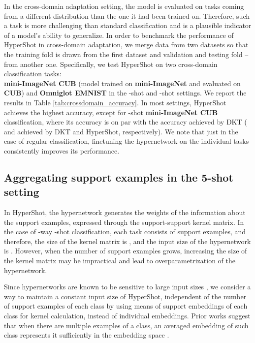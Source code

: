\documentclass[nohyperref]{article}
\def\our{HyperShot}
\theoremstyle{plain}
\theoremstyle{definition}
\theoremstyle{remark}
\begin{document}
In the cross-domain adaptation setting, the model is evaluated on tasks coming from a different distribution than the one it had been trained on. Therefore, such a task is more challenging than standard classification and is a plausible indicator of a model’s ability to generalize. In order to benchmark the performance of \our{} in cross-domain adaptation, we merge data from two datasets so that the training fold is drawn from the first dataset and validation and testing fold -- from another one. Specifically, we test \our{} on two cross-domain classification tasks: \\
\textbf{mini-ImageNet  CUB} (model trained on \textbf{mini-ImageNet} and evaluated on \textbf{CUB}) and \textbf{Omniglot  EMNIST} in the -shot and -shot settings. We report the results in Table \ref{tab:crossdomain_accuracy}. In most settings, \our{} achieves the highest accuracy, except for -shot \textbf{mini-ImageNet  CUB} classification, where its accuracy is on par with the accuracy achieved by DKT \cite{patacchiola2020bayesian} ( and  achieved by DKT and \our{}, respectively). We note that just in the case of regular classification, finetuning the hypernetwork on the individual tasks consistently improves its performance.





\subsection{Aggregating support examples in the 5-shot setting}\label{sec:ablation}

In \our{}, the hypernetwork generates the weights of the information about the support examples, expressed through the support-support kernel matrix. In the case of -way -shot classification, each task consists of  support examples, and therefore, the size of the kernel matrix is , and the input size of the hypernetwork is . However, when the number of support examples grows, increasing the size of the kernel matrix may be impractical and lead to overparametrization of the hypernetwork. 

Since hypernetworks are known to be sensitive to large input sizes \cite{ha2016hypernetworks}, we consider a way to maintain a constant input size of \our{}, independent of the number of support examples of each class by using means of support embeddings of each class for kernel calculation, instead of individual embeddings. Prior works suggest that when there are multiple examples of a class, an averaged embedding of such class represents it sufficiently in the embedding space \cite{snell2017prototypical}. 
\end{document}
